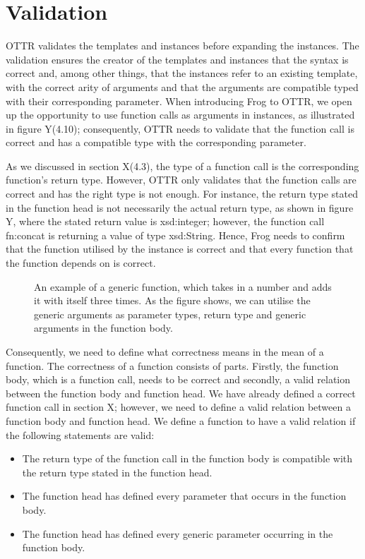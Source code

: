\section{Validation}
OTTR validates the templates and instances before expanding the instances. The validation ensures the creator of the templates and instances that the syntax is correct and, among other things, that the instances refer to an existing template, with the correct arity of arguments and that the arguments are compatible typed with their corresponding parameter. When introducing Frog to OTTR, we open up the opportunity to use function calls as arguments in instances, as illustrated in figure Y(4.10); consequently, OTTR needs to validate that the function call is correct and has a compatible type with the corresponding parameter. 

\para
As we discussed in section X(4.3), the type of a function call is the corresponding function's return type. However, OTTR only validates that the function calls are correct and has the right type is not enough. For instance, the return type stated in the function head is not necessarily the actual return type, as shown in figure Y, where the stated return value is xsd:integer; however, the function call fn:concat is returning a value of type xsd:String. Hence, Frog needs to confirm that the function utilised by the instance is correct and that every function that the function depends on is correct.

\begin{figure}
    \centering
    
    \caption{An example of a generic function, which takes in a number and adds it with itself three times. As the figure shows, we can utilise the generic arguments as parameter types, return type and generic arguments in the function body. }
    \label{fig:wrong_function}
\end{figure}

\para
Consequently, we need to define what correctness means in the mean of a function. The correctness of a function consists of parts. Firstly, the function body, which is a function call, needs to be correct and secondly, a valid relation between the function body and function head. We have already defined a correct function call in section X; however, we need to define a valid relation between a function body and function head. We define a function to have a valid relation if the following statements are valid:
\begin{itemize}
    \item The return type of the function call in the function body is compatible with the return type stated in the function head. 
    \item The function head has defined every parameter that occurs in the function body.
    \item The function head has defined every generic parameter occurring in the function body.
\end{itemize} 

